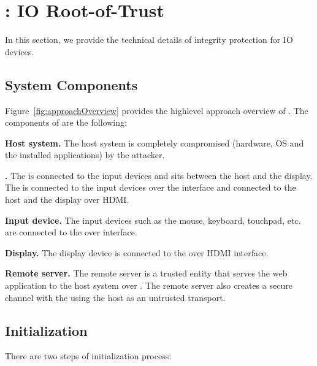 \section{\name: IO Root-of-Trust}
\label{sec:systemDesign}


In this section, we provide the technical details of \name integrity protection for IO devices.  

\subsection{System Components}
\label{sec:systemDesign:components}

Figure~\ref{fig:approachOverview} provides the highlevel approach overview of \name. The components of \name are the following:

\begin{mylist}
  \item \textbf{Host system.} The host system is completely compromised (hardware, OS and the installed applications) by the attacker.
  \item \textbf{\device.} The \device is connected to the input devices and sits between the host and the display. The \device is connected to the input devices over the \usb interface and connected to the host and the display over HDMI.
  \item \textbf{Input device.} The input devices such as the mouse, keyboard, touchpad, etc. are connected to the \device over \usb interface.
  \item \textbf{Display.} The display device is connected to the \device over HDMI interface.
  \item \textbf{Remote server.} The remote server is a trusted entity that serves the web application to the host system over \http. The remote server also creates a secure channel with the \device using the host as an untrusted transport. 
  
\end{mylist}

\iffalse
\subsection{Initialization} 
\label{sec:systemDesign:init}

There are two steps of initialization process: 

